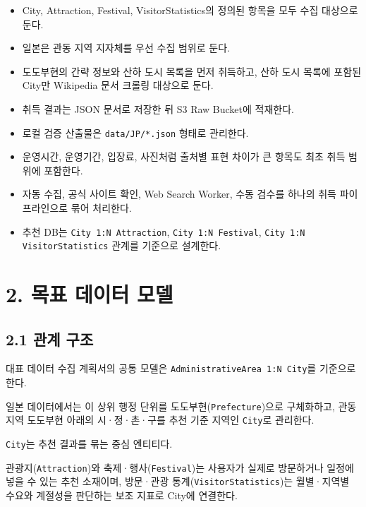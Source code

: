 \documentclass[12pt,a4paper]{article}
\newcommand{\DocNeedspace}[1]{\par\ifdim\dimexpr\pagegoal-\pagetotal\relax<#1\newpage\fi}
\begin{document}
\begin{itemize}
\item City, Attraction, Festival, VisitorStatistics의 정의된 항목을 모두 수집 대상으로 둔다.
\item 일본은 관동 지역 지자체를 우선 수집 범위로 둔다.
\item 도도부현의 간략 정보와 산하 도시 목록을 먼저 취득하고, 산하 도시 목록에 포함된 City만 Wikipedia 문서 크롤링 대상으로 둔다.
\item 취득 결과는 JSON 문서로 저장한 뒤 S3 Raw Bucket에 적재한다.
\item 로컬 검증 산출물은 \texttt{data/\allowbreak{}JP/\allowbreak{}*.\allowbreak{}json} 형태로 관리한다.
\item 운영시간, 운영기간, 입장료, 사진처럼 출처별 표현 차이가 큰 항목도 최초 취득 범위에 포함한다.
\item 자동 수집, 공식 사이트 확인, Web Search Worker, 수동 검수를 하나의 취득 파이프라인으로 묶어 처리한다.
\item 추천 DB는 \texttt{City 1:\allowbreak{}N Attraction}, \texttt{City 1:\allowbreak{}N Festival}, \texttt{City 1:\allowbreak{}N Visitor\allowbreak{}Statistics} 관계를 기준으로 설계한다.
\end{itemize}


\newpage

\DocNeedspace{10\baselineskip}
\section*{2. 목표 데이터 모델}


\DocNeedspace{8\baselineskip}
\subsection*{2.1 관계 구조}


\DocNeedspace{3\baselineskip}
대표 데이터 수집 계획서의 공통 모델은 \texttt{Administrative\allowbreak{}Area 1:\allowbreak{}N City}를 기준으로 한다.

\DocNeedspace{3\baselineskip}
일본 데이터에서는 이 상위 행정 단위를 도도부현(\texttt{Prefecture})으로 구체화하고, 관동 지역 도도부현 아래의 시·정·촌·구를 추천 기준 지역인 \texttt{City}로 관리한다.


\DocNeedspace{3\baselineskip}
\texttt{City}는 추천 결과를 묶는 중심 엔티티다.

\DocNeedspace{3\baselineskip}
관광지(\texttt{Attraction})와 축제·행사(\texttt{Festival})는 사용자가 실제로 방문하거나 일정에 넣을 수 있는 추천 소재이며, 방문·관광 통계(\texttt{Visitor\allowbreak{}Statistics})는 월별·지역별 수요와 계절성을 판단하는 보조 지표로 City에 연결한다.
\end{document}
